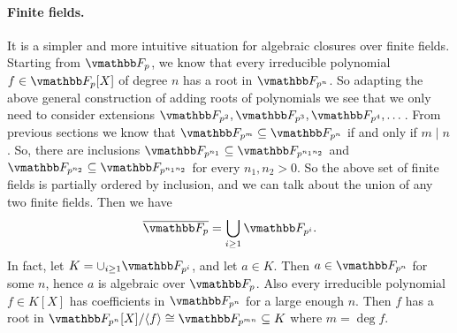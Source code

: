 \paragraph{Finite fields.} It is a simpler and more intuitive situation for algebraic closures over 
finite fields. Starting from $\F_p$, we know that every irreducible polynomial $f \in \F_p[X]$ of 
degree $n$ has a root in $\F_{p^n}$. So adapting the above general construction of adding roots of 
polynomials we see that we only need to consider extensions $\F_{p^2}, \F_{p^3}, \F_{p^4}, \dots$. 
From previous sections we know that $\F_{p^m} \subseteq \F_{p^n}$ if and only if $m \mid n$. So,  
there are inclusions $\F_{p^{n_1}} \subseteq \F_{p^{n_1n_2}}$ and $\F_{p^{n_2}} \subseteq 
\F_{p^{n_1n_2}}$ for every $n_1, n_2 > 0$. So the above set of finite fields is partially ordered 
by inclusion, and we can talk about the union of any two finite fields. Then we have 
\[ \overline{\F_p} = \bigcup_{i \ge 1} \F_{p^i}. \]
In fact, let $K = \cup_{i \ge 1} \F_{p^i}$, and let $a \in K$. Then $a \in \F_{p^n}$ for some $n$, 
hence $a$ is algebraic over $\F_p$. Also every irreducible polynomial $f \in K[X]$ has coefficients 
in $\F_{p^n}$ for a large enough $n$. Then $f$ has a root in $\F_{p^n}[X] / \ang{f} \cong 
\F_{p^{mn}} \subseteq K$ where $m = \deg f$.



